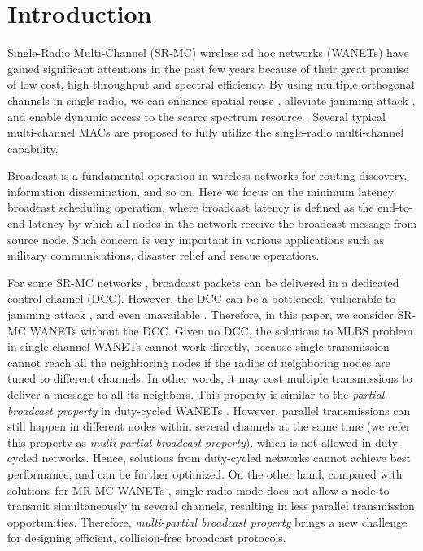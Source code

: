 \documentclass[10pt, conference]{IEEEtran}
\begin{document}
\section{Introduction}
Single-Radio Multi-Channel (SR-MC) wireless ad hoc networks (WANETs) have gained significant attentions in the past few years because of their great promise of low cost, high throughput and spectral efficiency. By using multiple orthogonal channels in single radio, we can enhance spatial reuse \cite{MMSN}, alleviate jamming attack \cite{Jamming}, and enable dynamic access to the scarce spectrum resource \cite{CRAHNs}. Several typical multi-channel MACs \cite{xRDT, CCR-MAC, Quorum} are proposed to fully utilize the single-radio multi-channel capability.

Broadcast is a fundamental operation in wireless networks for
routing discovery, information dissemination, and so on. Here
we focus on the minimum latency broadcast scheduling operation,
where broadcast latency is defined as the end-to-end latency by
which all nodes in the network receive the broadcast message
from source node. Such concern is very important in various
applications such as military communications, disaster relief
and rescue operations.

For some SR-MC networks \cite{CCR-MAC}, broadcast packets can be delivered in a dedicated control channel (DCC). However, the DCC can be a bottleneck, vulnerable to jamming attack \cite{Jamming}, and even unavailable \cite{CRAHNs}. Therefore, in this paper, we consider SR-MC WANETs without the DCC. Given no DCC, the solutions to MLBS problem in single-channel WANETs \cite{UDG, info07} cannot work directly, because single transmission cannot reach all the neighboring nodes if the radios of neighboring nodes are tuned to different channels. In other words, it may cost multiple transmissions to deliver a message to all its neighbors. This property is similar to the \emph{partial broadcast property} in duty-cycled WANETs \cite{ICC09, GC11}. However, parallel transmissions can still happen in different nodes within several channels at the same time (we refer this property as \emph{multi-partial broadcast property}), which is not allowed in duty-cycled networks. Hence, solutions from duty-cycled networks cannot achieve best performance, and can be further optimized. On the other hand, compared with solutions for MR-MC WANETs \cite{MR-MC}, single-radio mode does not allow a node to transmit simultaneously in several channels, resulting in less parallel transmission opportunities. Therefore, \emph{multi-partial broadcast property} brings a new challenge for designing efficient, collision-free broadcast protocols.
\end{document}
